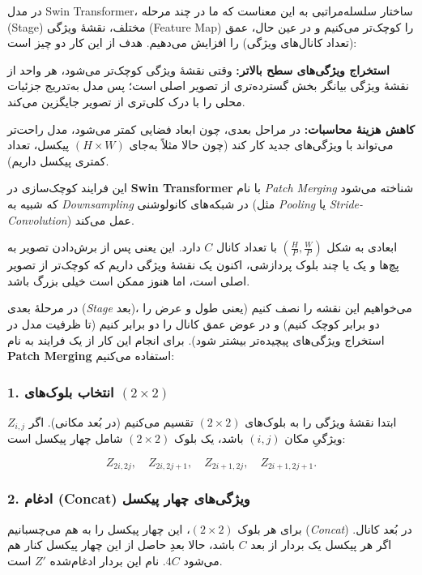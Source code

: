 در مدل Swin Transformer، ساختار سلسله‌مراتبی به این معناست که ما در چند مرحله (Stage) مختلف، نقشهٔ ویژگی (Feature Map) را کوچک‌تر می‌کنیم و در عین حال، عمق (تعداد کانال‌های ویژگی) را افزایش می‌دهیم. هدف از این کار دو چیز است:



\textbf{استخراج ویژگی‌های سطح بالاتر:} 
وقتی نقشهٔ ویژگی کوچک‌تر می‌شود، هر واحد از نقشهٔ ویژگی بیانگر بخش گسترده‌تری از تصویر اصلی است؛ 
پس مدل به‌تدریج جزئیات محلی را با درک کلی‌تری از تصویر جایگزین می‌کند.

\textbf{کاهش هزینهٔ محاسبات:} 
در مراحل بعدی، چون ابعاد فضایی کمتر می‌شود، مدل راحت‌تر می‌تواند با ویژگی‌های جدید کار کند 
(چون حالا مثلاً به‌جای \((H \times W)\) پیکسل، تعداد کمتری پیکسل داریم).

این فرایند کوچک‌سازی در \textbf{Swin Transformer} با نام \textit{Patch Merging} شناخته می‌شود 
که شبیه به \textit{Downsampling} در شبکه‌های کانولوشنی (مثل \textit{Pooling} یا \textit{Stride-Convolution}) عمل می‌کند.


 
ابعادی به شکل \((\tfrac{H}{P}, \tfrac{W}{P})\) با تعداد کانال \(\displaystyle C\) دارد. 
این یعنی پس از برش‌دادن تصویر به پچ‌ها و یک یا چند بلوک پردازشی، اکنون یک نقشهٔ ویژگی داریم که کوچک‌تر از تصویر اصلی است، 
اما هنوز ممکن است خیلی بزرگ باشد.

در مرحلهٔ بعدی (\textit{Stage} بعد)، می‌خواهیم این نقشه را نصف کنیم 
(یعنی طول و عرض را دو برابر کوچک کنیم) و در عوض عمق کانال را دو برابر کنیم 
(تا ظرفیت مدل در استخراج ویژگی‌های پیچیده‌تر بیشتر شود). برای انجام این کار از یک فرایند به نام 
\textbf{Patch Merging} استفاده می‌کنیم:

\subsubsection{1. انتخاب بلوک‌های \((2 \times 2)\)}
ابتدا نقشهٔ ویژگی را به بلوک‌های \((2 \times 2)\) تقسیم می‌کنیم (در بُعد مکانی). 
اگر \(\displaystyle Z_{i,j}\) ویژگیِ مکان \((i, j)\) باشد، 
یک بلوک \((2 \times 2)\) شامل چهار پیکسل است:

\[
Z_{2i, 2j}, \quad Z_{2i, 2j+1}, \quad Z_{2i+1, 2j}, \quad Z_{2i+1, 2j+1}.
\]

\subsubsection{2. ادغام (Concat) ویژگی‌های چهار پیکسل}
برای هر بلوک \((2 \times 2)\)، این چهار پیکسل را به هم می‌چسبانیم (\textit{Concat}) در بُعد کانال. 
اگر هر پیکسل یک بردار از بعد \(\displaystyle C\) باشد، حالا بعدِ حاصل از این چهار پیکسل کنار هم می‌شود \(\displaystyle 4C\). 
نام این بردار ادغام‌شده \(\displaystyle Z'\) است.

